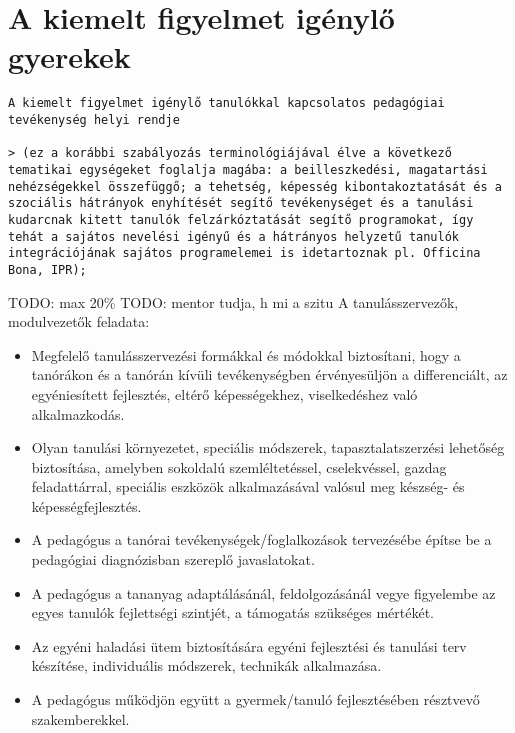 \section{A kiemelt figyelmet igénylő
  gyerekek}\label{sec:kiemelt_figyelem}

\begin{verbatim}
A kiemelt figyelmet igénylő tanulókkal kapcsolatos pedagógiai tevékenység helyi rendje

> (ez a korábbi szabályozás terminológiájával élve a következő tematikai egységeket foglalja magába: a beilleszkedési, magatartási nehézségekkel összefüggő; a tehetség, képesség kibontakoztatását és a szociális hátrányok enyhítését segítő tevékenységet és a tanulási kudarcnak kitett tanulók felzárkóztatását segítő programokat, így tehát a sajátos nevelési igényű és a hátrányos helyzetű tanulók integrációjának sajátos programelemei is idetartoznak pl. Officina Bona, IPR);
\end{verbatim}

TODO: max 20\% TODO: mentor tudja, h mi a szitu
A tanulásszervezők, modulvezetők feladata:

\begin{itemize}
  \item
        Megfelelő tanulásszervezési formákkal és módokkal biztosítani, hogy a
        tanórákon és a tanórán kívüli tevékenységben érvényesüljön a
        differenciált, az egyéniesített fejlesztés, eltérő képességekhez,
        viselkedéshez való alkalmazkodás.
  \item
        Olyan tanulási környezetet, speciális módszerek, tapasztalatszerzési
        lehetőség biztosítása, amelyben sokoldalú szemléltetéssel,
        cselekvéssel, gazdag feladattárral, speciális eszközök alkalmazásával
        valósul meg készség- és képességfejlesztés.
  \item
        A pedagógus a tanórai tevékenységek/foglalkozások tervezésébe építse
        be a pedagógiai diagnózisban szereplő javaslatokat.
  \item
        A pedagógus a tananyag adaptálásánál, feldolgozásánál vegye figyelembe
        az egyes tanulók fejlettségi szintjét, a támogatás szükséges mértékét.
  \item
        Az egyéni haladási ütem biztosítására egyéni fejlesztési és tanulási
        terv készítése, individuális módszerek, technikák alkalmazása.
  \item
        A pedagógus működjön együtt a gyermek/tanuló fejlesztésében résztvevő
        szakemberekkel.
\end{itemize}